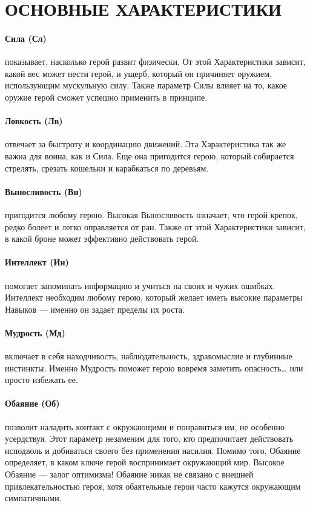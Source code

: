 \section{ОСНОВНЫЕ ХАРАКТЕРИСТИКИ}
\paragraph{Сила (Сл)} показывает, насколько герой развит физически. От этой Характеристики зависит, какой вес может нести герой, и ущерб, который он причиняет оружием, использующим мускульную силу. Также параметр Силы влияет на то, какое оружие герой сможет успешно применить в принципе.
\paragraph{Ловкость (Лв)} отвечает за быстроту и координацию движений. Эта Характеристика так же важна для воина, как и Сила. Еще она пригодится герою, который собирается стрелять, срезать кошельки и карабкаться по деревьям.
\paragraph{Выносливость (Вн)} пригодится любому герою. Высокая Выносливость означает, что герой крепок, редко болеет и легко оправляется от ран. Также от этой Характеристики зависит, в какой броне может эффективно действовать герой.
\paragraph{Интеллект (Ин)} помогает запоминать информацию и учиться на своих и чужих ошибках. Интеллект необходим любому герою, который желает иметь высокие параметры Навыков — именно он задает пределы их роста.
\paragraph{Мудрость (Мд)} включает в себя находчивость, наблюдательность, здравомыслие и глубинные инстинкты. Именно Мудрость поможет герою вовремя заметить опасность… или просто избежать ее.
\paragraph{Обаяние (Об)} позволит наладить контакт с окружающими и понравиться им, не особенно усердствуя. Этот параметр незаменим для того, кто предпочитает действовать исподволь и добиваться своего без применения насилия. Помимо того, Обаяние определяет, в каком ключе герой воспринимает окружающий мир. Высокое Обаяние — залог оптимизма! Обаяние никак не связано с внешней привлекательностью героя, хотя обаятельные герои часто кажутся окружающим симпатичными.
